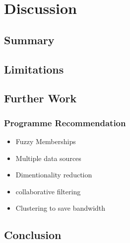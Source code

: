 \section{Discussion}
	\subsection{Summary}
	\subsection{Limitations}
	\subsection{Further Work}
		\subsubsection{Programme Recommendation}
		\begin{itemize}
			\item Fuzzy Memberships
			\item Multiple data sources
			\item Dimentionality reduction
			\item collaborative filtering
			\item Clustering to save bandwidth
		\end{itemize}
	\subsection{Conclusion}

